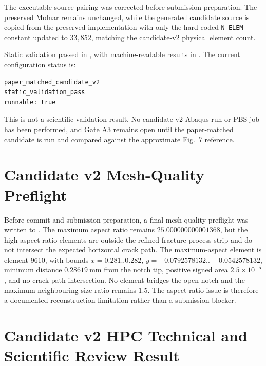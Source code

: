 \documentclass[11pt,a4paper]{article}
\begin{document}
The executable source pairing was corrected before submission preparation. The preserved Molnar  remains unchanged, while the generated candidate source  is copied from the preserved implementation with only the hard-coded \texttt{N\_ELEM} constant updated to \(33{,}852\), matching the candidate-v2 physical element count.

Static validation passed in , with machine-readable results in . The current configuration status is:

\begin{verbatim}
paper_matched_candidate_v2
static_validation_pass
runnable: true
\end{verbatim}

This is not a scientific validation result. No candidate-v2 Abaqus run or PBS job has been performed, and Gate A3 remains open until the paper-matched candidate is run and compared against the approximate Fig.~7 reference.

\section{Candidate v2 Mesh-Quality Preflight}

Before commit and submission preparation, a final mesh-quality preflight was written to . The maximum aspect ratio remains \(25.000000000001368\), but the high-aspect-ratio elements are outside the refined fracture-process strip and do not intersect the expected horizontal crack path. The maximum-aspect element is element 9610, with bounds \(x=0.281..0.282\), \(y=-0.0792578132..-0.0542578132\), minimum distance \(0.28619\ \mathrm{mm}\) from the notch tip, positive signed area \(2.5\times10^{-5}\), and no crack-path intersection. No element bridges the open notch and the maximum neighbouring-size ratio remains \(1.5\). The aspect-ratio issue is therefore a documented reconstruction limitation rather than a submission blocker.

\section{Candidate v2 HPC Technical and Scientific Review Result}
\end{document}
